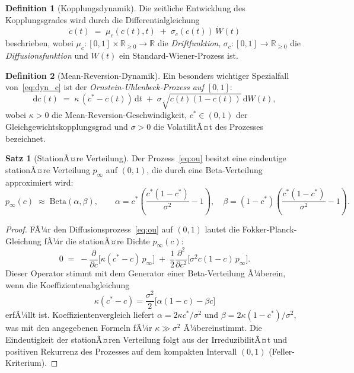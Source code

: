 ﻿\documentclass[a4paper,12pt]{article}
\theoremstyle{definition}
\newtheorem{definition}{Definition}
\newtheorem{satz}{Satz}
\begin{document}
\begin{definition}[Kopplungsdynamik]
\label{def:kopplungsDyn}
    Die zeitliche Entwicklung des Kopplungsgrades wird durch die
    Differentialgleichung
    \begin{equation}
    \label{eq:dyn_c}
        \dot{c}(t) \;=\; \mu_c(c(t), t) \;+\; \sigma_c(c(t))\,\dot{W}(t)
    \end{equation}
    beschrieben, wobei $\mu_c : [0,1] \times \mathbb{R}_{\geq 0} \to \mathbb{R}$
    die \emph{Driftfunktion}, $\sigma_c : [0,1] \to \mathbb{R}_{\geq 0}$
    die \emph{Diffusionsfunktion} und $W(t)$ ein Standard-Wiener-Prozess ist.
\end{definition}

\begin{definition}[Mean-Reversion-Dynamik]
\label{def:meanRev}
    Ein besonders wichtiger Spezialfall von~\eqref{eq:dyn_c} ist der
    \emph{Ornstein-Uhlenbeck-Prozess auf $[0,1]$}:
    \begin{equation}
    \label{eq:ou}
        \mathrm{d}c(t) \;=\; \kappa\,(c^* - c(t))\,\mathrm{d}t
        \;+\; \sigma\sqrt{c(t)(1-c(t))}\,\mathrm{d}W(t),
    \end{equation}
    wobei $\kappa > 0$ die Mean-Reversion-Geschwindigkeit,
    $c^* \in (0,1)$ der Gleichgewichtskopplungsgrad und
    $\sigma > 0$ die VolatilitÃ¤t des Prozesses bezeichnet.
\end{definition}

\begin{satz}[StationÃ¤re Verteilung]
\label{satz:stationaer}
    Der Prozess~\eqref{eq:ou} besitzt eine eindeutige stationÃ¤re
    Verteilung $p_\infty$ auf $(0,1)$, die durch eine Beta-Verteilung
    approximiert wird:
    \[
        p_\infty(c) \;\approx\; \mathrm{Beta}(\alpha, \beta), \qquad
        \alpha = c^* \!\left(\frac{c^*(1-c^*)}{\sigma^2} - 1\right), \quad
        \beta = (1-c^*)\!\left(\frac{c^*(1-c^*)}{\sigma^2} - 1\right).
    \]
\end{satz}

\begin{proof}
    FÃ¼r den Diffusionsprozess~\eqref{eq:ou} auf $(0,1)$ lautet die
    Fokker-Planck-Gleichung fÃ¼r die stationÃ¤re Dichte $p_\infty(c)$:
    \[
        0 \;=\; -\frac{\partial}{\partial c}\!\bigl[\kappa(c^*-c)\,p_\infty\bigr]
        \;+\; \frac{1}{2}\frac{\partial^2}{\partial c^2}
              \!\bigl[\sigma^2 c(1-c)\,p_\infty\bigr].
    \]
    Dieser Operator stimmt mit dem Generator einer Beta-Verteilung Ã¼berein, wenn
    die Koeffizientenabgleichung
    \[
        \kappa(c^* - c) = \frac{\sigma^2}{2}\bigl[\alpha(1-c) - \beta c\bigr]
    \]
    erfÃ¼llt ist. Koeffizientenvergleich liefert $\alpha = 2\kappa c^*/\sigma^2$
    und $\beta = 2\kappa(1-c^*)/\sigma^2$, was mit den angegebenen Formeln
    fÃ¼r $\kappa \gg \sigma^2$ Ã¼bereinstimmt. Die Eindeutigkeit der stationÃ¤ren
    Verteilung folgt aus der IrreduzibilitÃ¤t und positiven Rekurrenz des
    Prozesses auf dem kompakten Intervall $(0,1)$ (Feller-Kriterium).
\end{proof}
\end{document}
